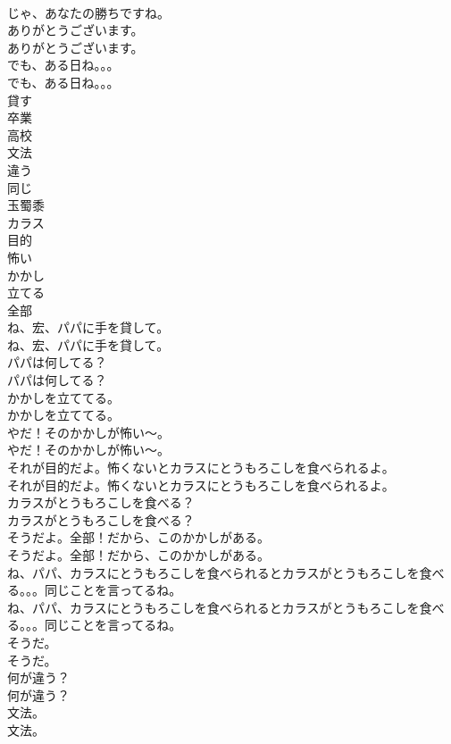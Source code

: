 \documentclass[8pt]{extreport}
\begin{document}
\begin{CJK}{UTF8}{min}
\\	じゃ、あなたの勝ちですね。 
\\	ありがとうございます。	
\\	ありがとうございます。 
\\	でも、ある日ね。。。	
\\	でも、ある日ね。。。 
\\	貸す
\\	卒業
\\	高校
\\	文法
\\	違う
\\	同じ
\\	玉蜀黍
\\	カラス
\\	目的
\\	怖い
\\	かかし
\\	立てる
\\	全部
\\	ね、宏、パパに手を貸して。	
\\	ね、宏、パパに手を貸して。 
\\	パパは何してる？	
\\	パパは何してる？ 
\\	かかしを立ててる。	
\\	かかしを立ててる。 
\\	やだ！そのかかしが怖い〜。	
\\	やだ！そのかかしが怖い〜。 
\\	それが目的だよ。怖くないとカラスにとうもろこしを食べられるよ。	
\\	それが目的だよ。怖くないとカラスにとうもろこしを食べられるよ。 
\\	カラスがとうもろこしを食べる？	
\\	カラスがとうもろこしを食べる？ 
\\	そうだよ。全部！だから、このかかしがある。	
\\	そうだよ。全部！だから、このかかしがある。 
\\	ね、パパ、カラスにとうもろこしを食べられるとカラスがとうもろこしを食べる。。。同じことを言ってるね。	
\\	ね、パパ、カラスにとうもろこしを食べられるとカラスがとうもろこしを食べる。。。同じことを言ってるね。 
\\	そうだ。	
\\	そうだ。 
\\	何が違う？	
\\	何が違う？ 
\\	文法。	
\\	文法。 

\end{CJK}
\end{document}
